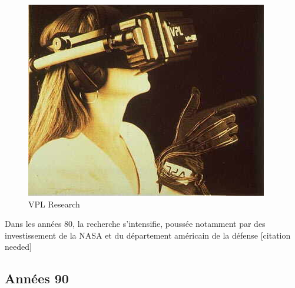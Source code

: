 \documentclass[a4]{scrartcl}
\begin{document}
\begin{figure}[!h]
	\centering
	\includegraphics[width=0.6\linewidth]{vpl-hmd}
	\caption{VPL Research}
\end{figure}

Dans les années 80, la recherche s'intensifie, poussée notamment par des investissement de la NASA et du département américain de la défense [citation needed]

\subsection{Années 90}
\end{document}
